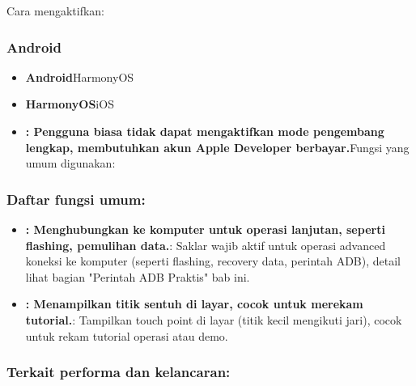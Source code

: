 


Cara mengaktifkan:

\subsubsection*{Android}

\begin{itemize}
  \item \textbf{Android}HarmonyOS
  \item \textbf{HarmonyOS}iOS
  \item \textbf{: Pengguna biasa tidak dapat mengaktifkan mode pengembang lengkap, membutuhkan akun Apple Developer berbayar.}Fungsi yang umum digunakan:
\end{itemize}

\subsubsection*{Daftar fungsi umum:}

\begin{itemize}
  \item \textbf{: Menghubungkan ke komputer untuk operasi lanjutan, seperti flashing, pemulihan data.}: Saklar wajib aktif untuk operasi advanced koneksi ke komputer (seperti flashing, recovery data, perintah ADB), detail lihat bagian "Perintah ADB Praktis" bab ini.
  \item \textbf{: Menampilkan titik sentuh di layar, cocok untuk merekam tutorial.}: Tampilkan touch point di layar (titik kecil mengikuti jari), cocok untuk rekam tutorial operasi atau demo.
\end{itemize}

\subsubsection*{Terkait performa dan kelancaran:}

